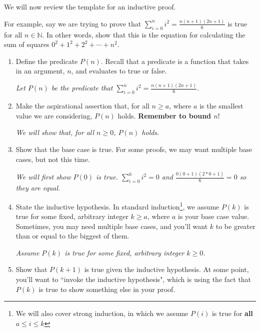 \documentclass[12pt,letterpaper]{article}
\newcommand\N{\mathbb N}
\begin{document}
      We will now review the template for an inductive proof.


      For example, say we are trying to prove that $\sum_{i=0}^n i^2 = \frac{n(n+1)(2n+1)}{6}$ is true for all $n \in \N$. In other words, show that this is the equation for calculating the sum of squares $0^2 + 1^2 + 2^2 + \cdots + n^2$.

      \begin{enumerate}
        \item Define the predicate $P(n)$. Recall that a predicate is a function that takes in an argument, $n$, and evaluates to true or false.
        
         \textit{Let $P(n)$ be the predicate that $\sum_{i=0}^n i^2 = \frac{n(n+1)(2n+1)}{6}$.}
        
        \item Make the aspirational assertion that, for all $n \geq a$, where $a$ is the smallest value we are considering, $P(n)$ holds. \textbf{Remember to bound $n$}! 
        
        \textit{We will show that, for all $n \geq 0$, $P(n)$ holds.}

        \item Show that the base case is true. For some proofs, we may want multiple base cases, but not this time.

        \textit{We will first show $P(0)$ is true. $\sum_{i=0}^0 i^2 = 0$ and $\frac{0(0+1)(2*0+1)}{6} = 0$ so they are equal.}

        \item State the inductive hypothesis. In standard induction\footnote{We will also cover strong induction, in which we assume $P(i)$ is true for \textbf{all} $a \le i \leq k$}, we assume 
			$P(k)$ is true for some fixed, arbitrary integer $k \geq a$, where $a$ is your base case value. Sometimes, you may need multiple base cases, and you'll want $k$ to be greater than or equal to the biggest of them.

        \textit{Assume $P(k)$ is true for some fixed, arbitrary integer $k \geq 0$.}

        \item Show that $P(k+1)$ is true given the inductive hypothesis. At some point, you'll want to ``invoke the inductive hypothesis", which is using the fact that $P(k)$ is true to show something else in your proof.


\end{enumerate}
\end{document}

